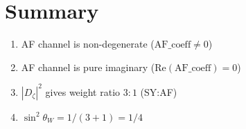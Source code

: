 \section{Summary}
\label{sec:weinberg_summary}

\begin{theorem}
\label{thm:weinberg_summary}
\leanok
\begin{enumerate}
\item AF channel is non-degenerate ($\mathrm{AF\_coeff} \neq 0$)
\item AF channel is pure imaginary ($\mathrm{Re}(\mathrm{AF\_coeff}) = 0$)
\item $|D_\zeta|^2$ gives weight ratio $3:1$ (SY:AF)
\item $\sin^2\theta_W = 1/(3+1) = 1/4$
\end{enumerate}
\end{theorem}

